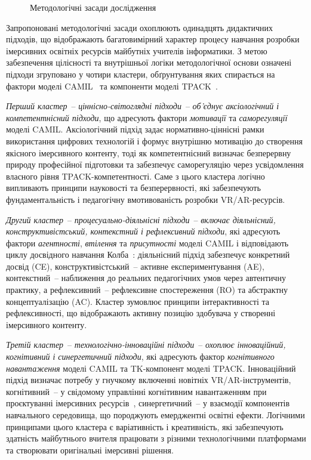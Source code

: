 \begin{figure}[!h]
\centering

\caption{Методологічні засади дослідження}
\label{fig:2.2}
\end{figure}

Запропоновані методологічні засади охоплюють одинадцять дидактичних підходів, що відображають багатовимірний характер процесу навчання розробки імерсивних освітніх ресурсів майбутніх учителів інформатики. З метою забезпечення цілісності та внутрішньої логіки методологічної основи означені підходи згруповано у чотири кластери, обґрунтування яких спирається на фактори моделі CAMIL~\cite{Makransky2021CAMIL} та компоненти моделі TPACK~\cite{Gurevych2015Integration}.

\emph{Перший кластер}~-- \emph{ціннісно-світоглядні підходи}~-- \emph{об'єднує аксіологічний і компетентнісний підходи}, що адресують фактори \emph{мотивації} та \emph{саморегуляції} моделі CAMIL. Аксіологічний підхід задає нормативно-ціннісні рамки використання цифрових технологій і формує внутрішню мотивацію до створення якісного імерсивного контенту, тоді як компетентнісний визначає безперервну природу професійної підготовки та забезпечує саморегуляцію через усвідомлення власного рівня TPACK-компетентності. Саме з цього кластера логічно випливають принципи науковості та безперервності, які забезпечують фундаментальність і педагогічну вмотивованість розробки VR/AR-ресурсів.

\emph{Другий кластер}~-- \emph{процесуально-діяльнісні підходи}~-- \emph{включає діяльнісний, конструктивістський, контекстний і рефлексивний підходи}, які адресують фактори \emph{агентності}, \emph{втілення} та \emph{присутності} моделі CAMIL і відповідають циклу досвідного навчання Колба~\cite{Kee2023Experiential}: діяльнісний підхід забезпечує конкретний досвід (CE), конструктивістський~-- активне експериментування (AE), контекстний~-- наближення до реальних педагогічних умов через автентичну практику, а рефлексивний~-- рефлексивне спостереження (RO) та абстрактну концептуалізацію (AC). Кластер зумовлює принципи інтерактивності та рефлексивності, що відображають активну позицію здобувача у створенні імерсивного контенту.

\emph{Третій кластер}~-- \emph{технологічно-інноваційні підходи}~-- \emph{охоплює інноваційний, когнітивний і синергетичний підходи}, які адресують фактор \emph{когнітивного навантаження} моделі CAMIL та TK-компонент моделі TPACK. Інноваційний підхід визначає потребу у гнучкому включенні новітніх VR/AR-інструментів, когнітивний~-- у свідомому управлінні когнітивним навантаженням при проєктуванні імерсивних ресурсів~\cite{Buchner2021CogLoad}, синергетичний~-- у взаємодії компонентів навчального середовища, що породжують емерджентні освітні ефекти. Логічними принципами цього кластера є варіативність і креативність, які забезпечують здатність майбутнього вчителя працювати з різними технологічними платформами та створювати оригінальні імерсивні рішення.

